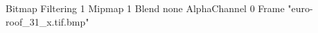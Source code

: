{Bitmap
	{Filtering 1}
	{Mipmap 1}
	{Blend none}
	{AlphaChannel 0}
	{Frame "euro-roof_31_x.tif.bmp"}
}
